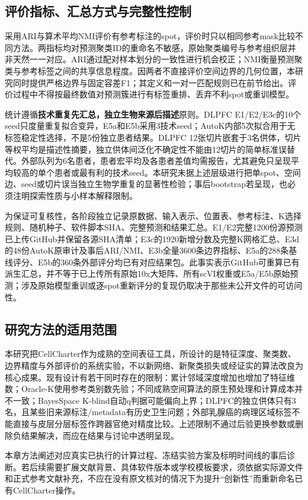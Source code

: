 \subsection{评价指标、汇总方式与完整性控制}
\label{subsec:cc-metrics-v1}

采用ARI与算术平均NMI评价有参考标注的spot，评价时只以相同参考mask比较不同方法。两指标均对预测聚类ID的重命名不敏感，原始聚类编号与参考组织层并非天然一一对应。ARI通过配对样本划分的一致性进行机会校正；NMI衡量预测聚类与参考标签之间的共享信息程度。因两者不直接评价空间边界的几何位置，本研究同时提供严格边界与固定容差F1；其定义和一对一匹配规则已在前节给出。评价过程中不得按最终数值对预测簇进行有标签重排、丢弃不利spot或重训模型。

统计遵循\textbf{技术重复先汇总，独立生物来源后描述}原则。DLPFC E1/E2/E3c的10个seed只度量重复拟合变异，E5a和E5b采用3技术seed；AutoK内部5次拟合用于无标签稳定性选择，不是5份独立患者结果。DLPFC 12张切片嵌套于3名供体，切片等权平均是描述性摘要，独立供体间泛化不确定性不能由12切片的简单标准误替代。外部队列为6名患者，患者宏平均及各患者差值均需报告，尤其避免只呈现平均较高的单个患者或最有利的技术seed。本研究未据上述层级进行把单spot、空间边、seed或切片误当独立生物学重复的显著性检验；事后bootstrap若呈现，也必须注明探索性质与小样本解释限制。

为保证可复核性，各阶段独立记录原数据、输入表示、位置表、参考标注、K选择规则、随机种子、软件脚本SHA、完整预测和结果汇总。E1/E2完整1200份源预测已上传GitHub并保留各源SHA清单；E3c的1920新增分数及完整K网格汇总、E3d的48份AutoK原审计及事后ARI/NMI、E3b全量3600条边界指标、E5a的288条基线评分、E5b的360条外部评分均已有对应结果包。此事实表示GitHub可重算已有派生汇总，并不等于已上传所有原始10x大矩阵、所有scVI权重或E5a/E5b原始预测；涉及原始模型重训或逐spot重新评分的复现仍取决于那些未公开文件的可访问性。

\subsection{研究方法的适用范围}
\label{subsec:cc-method-limits-v1}

本研究把CellCharter作为成熟的空间表征工具，所设计的是特征深度、聚类数、边界精度与外部评价的系统实验，不以新网络、新聚类损失或经证实的算法改良为核心成果。现有设计有若干同时存在的限制：累计邻域深度增加也增加了特征维数；Oracle-K使用参考类别数先验；不同成熟空间算法的原生预处理和计算成本并不一致；BayesSpace K-blind自动q判据可能偏向上界；DLPFC的独立供体只有3名，且某些旧来源标注/metadata有历史卫生问题；外部乳腺癌的病理区域标签不能直接与皮层分层标签作跨器官绝对精度比较。上述限制不通过后验更换参数或删除负结果解决，而应在结果与讨论中透明呈现。

本章方法阐述对应真实已执行的计算过程、冻结实验方案及标明时间线的事后诊断。若后续需要扩展文献背景、具体软件版本或学校模板要求，须依据实际源文件和正式参考文献补充，不应在没有原文核对的情况下为提升“创新性”而重新命名已有CellCharter操作。
